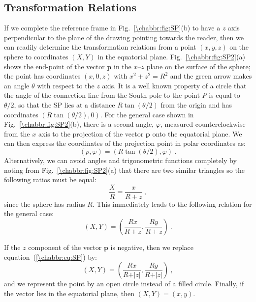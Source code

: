 
\subsection{Transformation Relations}\label{\chabbr:ssec:SPmath}
If we complete the reference frame in Fig.~\ref{\chabbr:fig:SP}(b) to have a $z$ axis perpendicular to the plane of the drawing pointing towards the reader, then we can readily determine the transformation relations from a point $(x,y,z)$ on the sphere to coordinates $(X,Y)$ in the equatorial plane.  Fig.~\ref{\chabbr:fig:SP2}(a) shows the end-point of the vector $\mathbf{p}$ in the $x$--$z$ plane on the surface of the sphere; the point has coordinates $(x,0,z)$ with $x^2+z^2=R^2$ and the green arrow makes an angle $\theta$ with respect to the $z$ axis.  It is a well known property of a circle that the angle of the connection line from the South pole to the point $P$ is equal to $\theta/2$, so that the SP lies at a distance $R\tan(\theta/2)$ from the origin and has coordinates $(R\tan(\theta/2),0)$.  For the general case shown in  Fig.~\ref{\chabbr:fig:SP2}(b), there is a second angle, $\varphi$, measured counterclockwise  from the $x$ axis to the projection of the vector $\mathbf{p}$ onto the equatorial plane. We can then express the coordinates of the projection point in polar coordinates as:
\begin{equation}
	(\rho,\varphi) = (R\tan(\theta/2),\varphi)\ .
\end{equation}
Alternatively, we can avoid angles and trigonometric functions completely by noting from Fig.~\ref{\chabbr:fig:SP2}(a) that there are two similar triangles so the following ratios must be equal:
\[
	\frac{X}{R} = \frac{x}{R+z}\ ,
\]
since the sphere has radius $R$. This immediately leads to the following relation for the general case:
\begin{equation}
	(X,Y) = \left(\frac{Rx}{R+z},\frac{Ry}{R+z}\right)\ .\label{\chabbr:eq:SP}
\end{equation}


\noindent If the $z$ component of the vector $\mathbf{p}$ is negative, then we replace equation~(\ref{\chabbr:eq:SP}) by:
\begin{equation}
	(X,Y) = \left(\frac{Rx}{R+\vert z\vert},\frac{Ry}{R+\vert z\vert}\right)\ ,\label{\chabbr:eq:SPalt}
\end{equation}
and we represent the point by an open circle instead of a filled circle.  Finally, if the vector lies in the equatorial plane, then $(X,Y)=(x,y)$.

